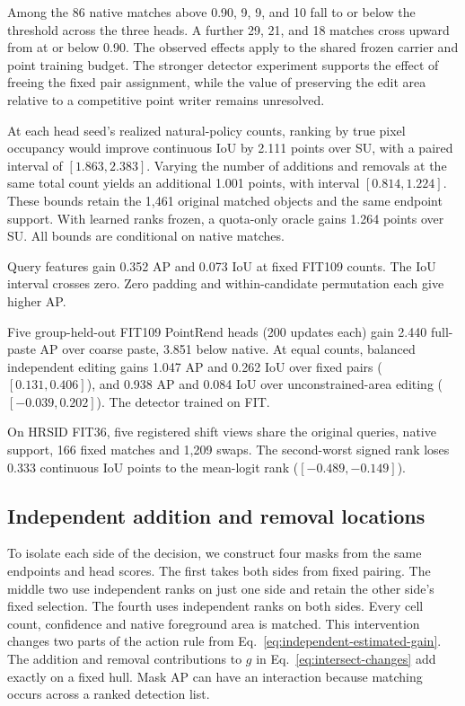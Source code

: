 \documentclass[journal]{IEEEtran}
\begin{document}
Among the 86 native matches above 0.90, 9, 9, and 10 fall to or below the threshold across the three heads. A further 29, 21, and 18 matches cross upward from at or below 0.90. The observed effects apply to the shared frozen carrier and point training budget. The stronger detector experiment supports the effect of freeing the fixed pair assignment, while the value of preserving the edit area relative to a competitive point writer remains unresolved.





At each head seed's realized natural-policy counts, ranking by true pixel occupancy would improve continuous IoU by 2.111 points over SU, with a paired interval of \([1.863,2.383]\). Varying the number of additions and removals at the same total count yields an additional 1.001 points, with interval \([0.814,1.224]\). These bounds retain the 1,461 original matched objects and the same endpoint support. With learned ranks frozen, a quota-only oracle gains 1.264 points over SU. All bounds are conditional on native matches.

Query features gain 0.352 AP and 0.073 IoU at fixed FIT109 counts. The IoU interval crosses zero. Zero padding and within-candidate permutation each give higher AP.

Five group-held-out FIT109 PointRend heads (200 updates each) gain 2.440 full-paste AP over coarse paste, 3.851 below native. At equal counts, balanced independent editing gains 1.047 AP and 0.262 IoU over fixed pairs (\([0.131,0.406]\)), and 0.938 AP and 0.084 IoU over unconstrained-area editing (\([-0.039,0.202]\)). The detector trained on FIT.

On HRSID FIT36, five registered shift views share the original queries, native support, 166 fixed matches and 1,209 swaps. The second-worst signed rank loses 0.333 continuous IoU points to the mean-logit rank (\([-0.489,-0.149]\)).

\subsection{Independent addition and removal locations}
\label{sec:side-ablation}

To isolate each side of the decision, we construct four masks from the same endpoints and head scores. The first takes both sides from fixed pairing. The middle two use independent ranks on just one side and retain the other side's fixed selection. The fourth uses independent ranks on both sides. Every cell count, confidence and native foreground area is matched. This intervention changes two parts of the action rule from Eq.~\eqref{eq:independent-estimated-gain}. The addition and removal contributions to \(g\) in Eq.~\eqref{eq:intersect-changes} add exactly on a fixed hull. Mask AP can have an interaction because matching occurs across a ranked detection list.
\end{document}
